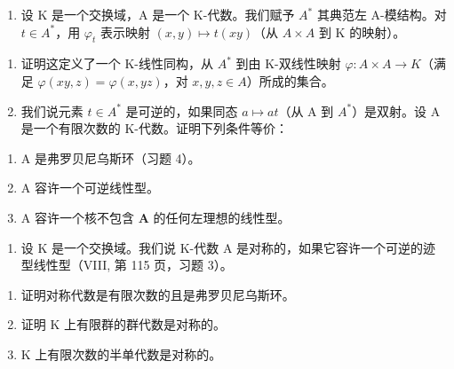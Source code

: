 \begin{enumerate}
\def\labelenumi{\arabic{enumi})}
\setcounter{enumi}{4}
\tightlist
\item
  设 K 是一个交换域，A 是一个 K-代数。我们赋予 \(A^{*}\) 其典范左 A-模结构。对 \(t \in A^{*}\)，用 \(\varphi_{t}\) 表示映射 \((x, y) \mapsto t(xy)\)（从 \(A \times A\) 到 K 的映射）。
\end{enumerate}

\begin{enumerate}
\def\labelenumi{\alph{enumi})}
\item
  证明这定义了一个 K-线性同构，从 \(A^{*}\) 到由 K-双线性映射 \(\varphi: A \times A \to K\)（满足 \(\varphi(xy, z) = \varphi(x, yz)\)，对 \(x, y, z \in A\)）所成的集合。
\item
  我们说元素 \(t \in A^{*}\) 是可逆的，如果同态 \(a \mapsto at\)（从 A 到 \(A^{*}\)）是双射。设 A 是一个有限次数的 K-代数。证明下列条件等价：
\end{enumerate}

\begin{enumerate}
\def\labelenumi{(\roman{enumi})}
\item
  A 是弗罗贝尼乌斯环（习题 4）。
\item
  A 容许一个可逆线性型。
\item
  A 容许一个核不包含 \(\mathbf{A}\) 的任何左理想的线性型。
\end{enumerate}

\begin{enumerate}
\def\labelenumi{\arabic{enumi})}
\setcounter{enumi}{5}
\tightlist
\item
  设 K 是一个交换域。我们说 K-代数 A 是对称的，如果它容许一个可逆的迹型线性型（VIII, 第 115 页，习题 3）。
\end{enumerate}

\begin{enumerate}
\def\labelenumi{\alph{enumi})}
\item
  证明对称代数是有限次数的且是弗罗贝尼乌斯环。
\item
  证明 \(\mathrm{K}\) 上有限群的群代数是对称的。
\item
  \(\mathrm{K}\) 上有限次数的半单代数是对称的。
\end{enumerate}

